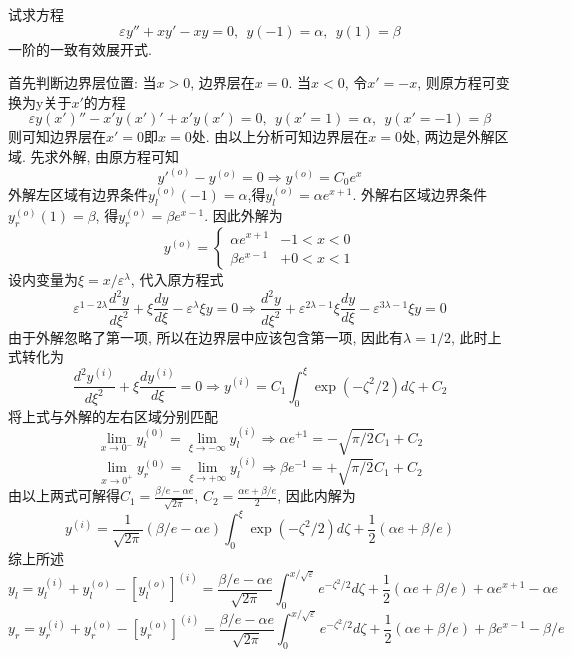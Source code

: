 \begin{problem}[习题7.23]
试求方程
\[
\varepsilon y'' + xy' - xy = 0,~~
y(-1)=\alpha, ~~ y(1) = \beta
\]
一阶的一致有效展开式.
\end{problem}

\begin{solution}
首先判断边界层位置: 当$x>0$, 边界层在$x=0$. 当$x<0$, 令$x'=-x$, 则原方程可变换为y关于$x'$的方程
\[
\varepsilon y(x')'' - x'y(x')' + x'y(x') = 0,~~
y(x'=1)=\alpha, ~~ y(x'=-1) = \beta
\]
则可知边界层在$x'=0$即$x=0$处. 由以上分析可知边界层在$x=0$处, 两边是外解区域. 先求外解, 由原方程可知
\[
y'^{(o)}-y^{(o)}=0\Rightarrow y^{(o)}=C_{0}e^{x}
\]
外解左区域有边界条件$y_{l}^{(o)}(-1)=\alpha$,得$y_{l}^{(o)}=\alpha e^{x+1}$.
外解右区域边界条件$y_{r}^{(o)}(1)=\beta$, 得$y_{r}^{(o)}=\beta e^{x-1}$. 因此外解为
\[
y^{(o)}=\begin{cases}
\alpha e^{x+1} & -1<x<0\\
\beta e^{x-1} & +0<x<1
\end{cases}
\]
设内变量为$\xi=x/\varepsilon^{\lambda}$, 代入原方程式
\[
\varepsilon^{1-2\lambda}\frac{d^{2}y}{d\xi^{2}}+\xi\frac{dy}{d\xi}-\varepsilon^{\lambda}\xi y=0\Rightarrow\frac{d^{2}y}{d\xi^{2}}+\varepsilon^{2\lambda-1}\xi\frac{dy}{d\xi}-\varepsilon^{3\lambda-1}\xi y=0
\]
由于外解忽略了第一项, 所以在边界层中应该包含第一项, 因此有$\lambda=1/2$, 此时上式转化为
\[
\frac{d^{2}y^{(i)}}{d\xi^{2}}+\xi\frac{dy^{(i)}}{d\xi}=0\Rightarrow y^{(i)}=C_{1}\int_{0}^{\xi}\exp(-\zeta^{2}/2)d\zeta+C_{2}
\]
将上式与外解的左右区域分别匹配
\[
\lim_{x\rightarrow0^{-}}y_{l}^{(0)}=\lim_{\xi\rightarrow-\infty}y_{l}^{(i)}\Rightarrow\alpha e^{+1}=-\sqrt{\pi/2}C_{1}+C_{2}
\]
\[
\lim_{x\rightarrow0^{+}}y_{r}^{(0)}=\lim_{\xi\rightarrow+\infty}y_{l}^{(i)}\Rightarrow\beta e^{-1}=+\sqrt{\pi/2}C_{1}+C_{2}
\]
由以上两式可解得$C_{1}=\frac{\beta/e-\alpha e}{\sqrt{2\pi}}$, $C_{2}=\frac{\alpha e+\beta/e}{2}$,
因此内解为
\[
y^{(i)}=\frac{1}{\sqrt{2\pi}}(\beta/e-\alpha e)\int_{0}^{\xi}\exp(-\zeta^{2}/2)d\zeta+\frac{1}{2}(\alpha e+\beta/e)
\]
综上所述
\[
y_{l}=y_{l}^{(i)}+y_{l}^{(o)}-[y_{l}^{(o)}]^{(i)}=\frac{\beta/e-\alpha e}{\sqrt{2\pi}}\int_{0}^{x/\sqrt{\varepsilon}}e^{-\zeta^{2}/2}d\zeta+\frac{1}{2}(\alpha e+\beta/e)+\alpha e^{x+1}-\alpha e
\]
\[
y_{r}=y_{r}^{(i)}+y_{r}^{(o)}-[y_{r}^{(o)}]^{(i)}=\frac{\beta/e-\alpha e}{\sqrt{2\pi}}\int_{0}^{x/\sqrt{\varepsilon}}e^{-\zeta^{2}/2}d\zeta+\frac{1}{2}(\alpha e+\beta/e)+\beta e^{x-1}-\beta/e
\]
\end{solution}
